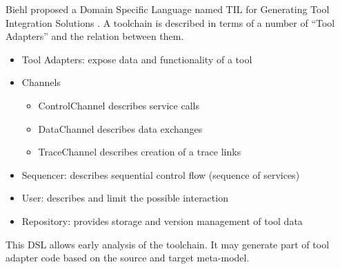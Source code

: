 Biehl proposed a Domain Specific Language named TIL for Generating Tool Integration
Solutions \cite{biehl_matthias_domain_2011}.  A toolchain is described in terms
of a number of ``Tool Adapters'' and the relation between them.
\begin{itemize}
\item Tool Adapters: expose data and functionality of a tool
\item Channels
  \begin{itemize}
  \item ControlChannel describes service calls
  \item DataChannel describes data exchanges
  \item TraceChannel  describes creation of a trace links
  \end{itemize}

\item Sequencer: describes sequential control flow (sequence of services)
\item User:  describes and limit the possible interaction
\item Repository:  provides storage and version management of tool data
\end{itemize}
This DSL allows early analysis of the toolchain.
It may generate part of tool adapter code based on the source and target
meta-model.

